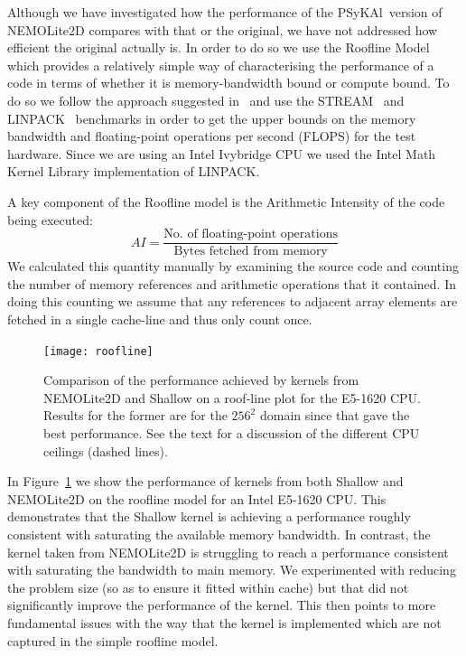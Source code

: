 \documentclass[journal]{IEEEtran}
\newcommand{\psykal}{{PS}y{KA}l}
\begin{document}
Although we have investigated how the performance of the \psykal\
version of NEMOLite2D compares with that or the original, we have not
addressed how efficient the original actually is. In order to do so we
use the Roofline Model~\cite{roofline} which provides a relatively
simple way of characterising the performance of a code in terms of
whether it is memory-bandwidth bound or compute bound. To do so we
follow the approach suggested in~\cite{para_pearls} and use the
STREAM~\cite{stream} and LINPACK~\cite{linpack} benchmarks in order to
get the upper bounds on the memory bandwidth and floating-point
operations per second (FLOPS) for the test hardware. Since we are
using an Intel Ivybridge CPU we used the Intel Math Kernel Library
implementation of LINPACK.

A key component of the Roofline model is the Arithmetic Intensity of
the code being executed:
\begin{equation}
AI = \frac{\textrm{No. of floating-point operations}}{\textrm{Bytes fetched from memory}}
\end{equation}
We calculated this quantity manually by examining the
source code and counting the number of memory references and
arithmetic operations that it contained. In doing this counting we
assume that any references to adjacent array elements are fetched in a
single cache-line and thus only count once.

\begin{figure}
\centering
\texttt{[image: roofline]}
\caption{Comparison of the performance achieved by kernels from
  NEMOLite2D and Shallow on a roof-line plot for the E5-1620
  CPU. Results for the former are for the $256^2$ domain since that
  gave the best performance. See the text for a discussion of the
  different CPU ceilings (dashed lines).}
\label{FIG_roofline}
\end{figure}

In Figure~\ref{FIG_roofline} we show the performance of kernels from
both Shallow and NEMOLite2D on the roofline model for an Intel E5-1620 CPU.
This demonstrates that the Shallow kernel is achieving a performance
roughly consistent with saturating the available memory bandwidth. In
contrast, the kernel taken from NEMOLite2D is struggling to reach a
performance consistent with saturating the bandwidth to main
memory. We experimented with reducing the problem size (so as to
ensure it fitted within cache) but that did not significantly improve
the performance of the kernel. This then points to more fundamental issues
with the way that the kernel is implemented which are not captured in the
simple roofline model.
\end{document}
